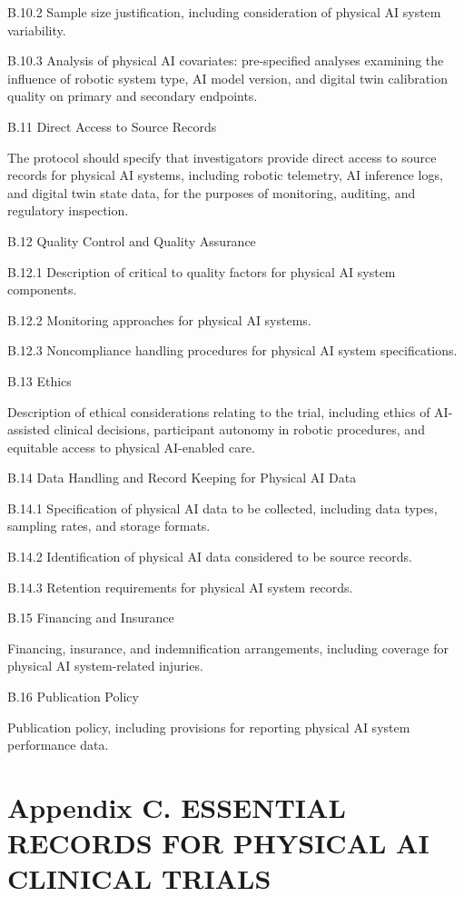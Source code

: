 B.10.2 Sample size justification, including consideration of physical AI system variability.

B.10.3 Analysis of physical AI covariates: pre-specified analyses examining the influence of robotic system type, AI model version, and digital twin calibration quality on primary and secondary endpoints.

B.11 Direct Access to Source Records

The protocol should specify that investigators provide direct access to source records for physical AI systems, including robotic telemetry, AI inference logs, and digital twin state data, for the purposes of monitoring, auditing, and regulatory inspection.

B.12 Quality Control and Quality Assurance

B.12.1 Description of critical to quality factors for physical AI system components.

B.12.2 Monitoring approaches for physical AI systems.

B.12.3 Noncompliance handling procedures for physical AI system specifications.

B.13 Ethics

Description of ethical considerations relating to the trial, including ethics of AI-assisted clinical decisions, participant autonomy in robotic procedures, and equitable access to physical AI-enabled care.

B.14 Data Handling and Record Keeping for Physical AI Data

B.14.1 Specification of physical AI data to be collected, including data types, sampling rates, and storage formats.

B.14.2 Identification of physical AI data considered to be source records.

B.14.3 Retention requirements for physical AI system records.

B.15 Financing and Insurance

Financing, insurance, and indemnification arrangements, including coverage for physical AI system-related injuries.

B.16 Publication Policy

Publication policy, including provisions for reporting physical AI system performance data.

\section{Appendix C. ESSENTIAL RECORDS FOR PHYSICAL AI CLINICAL TRIALS}

